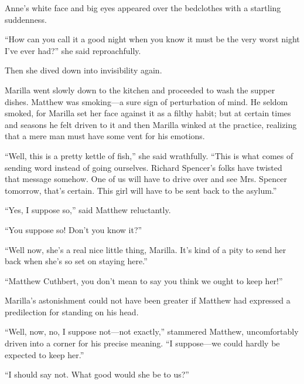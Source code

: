 \documentclass[a4paper]{article}
\begin{document}
Anne's white face and big eyes appeared over the bedclothes with a startling suddenness.

``How can you call it a good night when you know it must be the very worst night I've ever had?'' she said reproachfully.

Then she dived down into invisibility again.

Marilla went slowly down to the kitchen and proceeded to wash the supper dishes. Matthew was smoking---a sure sign of perturbation of mind. He seldom smoked, for Marilla set her face against it as a filthy habit; but at certain times and seasons he felt driven to it and then Marilla winked at the practice, realizing that a mere man must have some vent for his emotions.

``Well, this is a pretty kettle of fish,'' she said wrathfully. ``This is what comes of sending word instead of going ourselves. Richard Spencer's folks have twisted that message somehow. One of us will have to drive over and see Mrs. Spencer tomorrow, that's certain. This girl will have to be sent back to the asylum.''

``Yes, I suppose so,'' said Matthew reluctantly.

``You suppose so! Don't you know it?''

``Well now, she's a real nice little thing, Marilla. It's kind of a pity to send her back when she's so set on staying here.''

``Matthew Cuthbert, you don't mean to say you think we ought to keep her!''

Marilla's astonishment could not have been greater if Matthew had expressed a predilection for standing on his head.

``Well, now, no, I suppose not---not exactly,'' stammered Matthew, uncomfortably driven into a corner for his precise meaning. ``I suppose---we could hardly be expected to keep her.''

``I should say not. What good would she be to us?''
\end{document}
